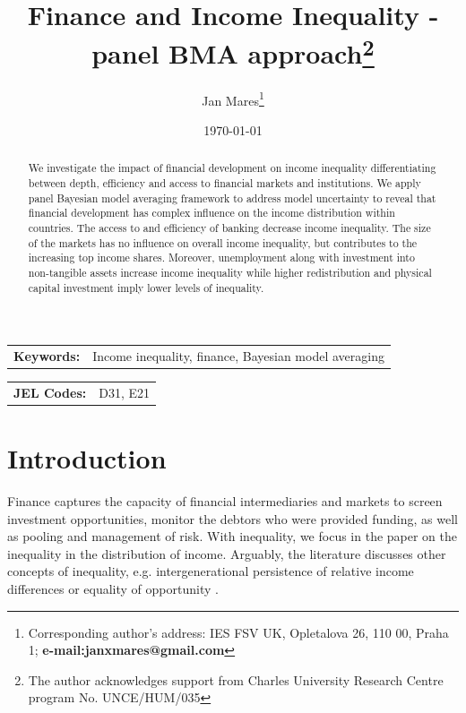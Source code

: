 \documentclass[a4paper,11pt]{article}
\title{Finance and Income Inequality - panel BMA approach\thanks{The author acknowledges support from Charles University Research Centre program No. UNCE/HUM/035}}
\author{Jan Mares\footnote{\footnotesize Corresponding author's address: IES FSV UK, Opletalova 26, 110 00, Praha 1; \textbf{e-mail:janxmares@gmail.com}}}
\affil{Charles University, Prague}
\date{\today}
\begin{document}
\def\sym#1{\ifmmode^{#1}\else\(^{#1}\)\fi} %

\maketitle

\thispagestyle{empty}
\begin{abstract}
    We investigate the impact of financial development on income inequality differentiating between depth, efficiency and access to financial markets and institutions. We apply panel Bayesian model averaging framework to address model uncertainty to reveal that financial development has complex influence on the income distribution within countries. The access to and efficiency of banking decrease income inequality. The size of the markets has no influence on overall income inequality, but contributes to the increasing top income shares. Moreover, unemployment along with investment into non-tangible assets increase income inequality while higher redistribution and physical capital investment imply lower levels of inequality.
\end{abstract}

\bigskip

\begin{tabular}{p{0.25\hsize}p{0.6\hsize}} %
\textbf{Keywords:} & Income inequality, finance, Bayesian model averaging
\end{tabular}

\bigskip

\begin{tabular}{p{0.25\hsize}p{0.6\hsize}}
\textbf{JEL Codes:} & D31, E21\\
\end{tabular}

\clearpage
\setcounter{page}{1}

\section{Introduction}

Finance captures the capacity of financial intermediaries and markets to screen investment opportunities, monitor the debtors who were provided funding, as well as pooling and management of risk. With inequality, we focus in the paper on the inequality in the distribution of income. Arguably, the literature discusses other concepts of inequality, e.g. intergenerational persistence of relative income differences or equality of opportunity \citep{demirgucc2009finance}.
\end{document}
